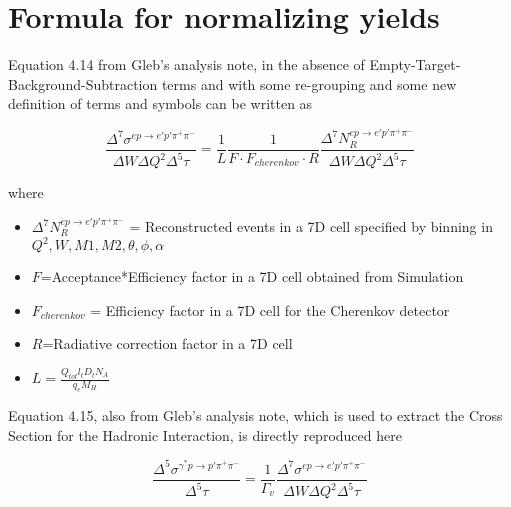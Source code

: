\documentclass[12pt]{article}
\begin{document}
\maketitle


\section{Formula for normalizing yields}

Equation 4.14 from Gleb's analysis note, in the absence of Empty-Target-Background-Subtraction terms and with some re-grouping and some new definition of terms and symbols can be written as 

\begin{equation}
\frac{\Delta^{7}\sigma^{ep \rightarrow e'p'\pi^{+}\pi^{-}}}{\Delta W \Delta Q^{2} \Delta^{5} \tau}
 =
\frac{1}{L}\frac{1}{F \cdot F_{cherenkov} \cdot R}\frac{\Delta^{7}N_{R}^{ep \rightarrow e'p'\pi^{+}\pi^{-}}}{\Delta W \Delta Q^{2} \Delta^{5} \tau}  
\end{equation}

where
\begin{itemize}
	\item $\Delta^{7}N_{R}^{ep \rightarrow e'p'\pi^{+}\pi^{-}}$ = Reconstructed events in a 7D cell specified by binning in $Q^2,W,M1,M2,\theta,\phi,\alpha$
	\item $F$=Acceptance*Efficiency factor in a 7D cell obtained from Simulation
	\item $F_{cherenkov}$ = Efficiency factor in a 7D cell for the Cherenkov detector
	\item $R$=Radiative correction factor in a 7D cell
	\item $L=\frac{Q_{tot}l_{t}D_{t}N_{A}}{q_{e}M_{H}}$
\end{itemize}

Equation 4.15, also from Gleb's analysis note, which is used to extract the Cross Section for the Hadronic Interaction, is directly reproduced here

\begin{equation}
\frac{\Delta^{5}\sigma^{\gamma^{*}p \rightarrow p'\pi^{+}\pi^{-}}}{\Delta^{5} \tau}
=
\frac{1}{\Gamma_{v}}\frac{\Delta^{7}\sigma^{ep \rightarrow e'p'\pi^{+}\pi^{-}}}{\Delta W \Delta Q^{2} \Delta^{5} \tau}
\end{equation}
\end{document}
